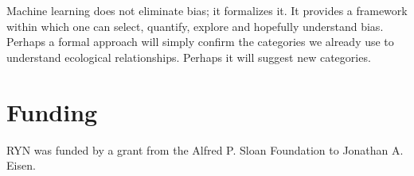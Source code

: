 \documentclass[
10pt, %
a4paper, %
oneside, %
headinclude,footinclude, %
BCOR5mm, %
]{scrartcl}
\begin{document}
Machine learning does not eliminate bias; it formalizes it. It provides a framework within which one can select, quantify, explore and hopefully understand bias. Perhaps a formal approach will simply confirm the categories we already use to understand ecological relationships. Perhaps it will suggest new categories.

\section{Funding}

RYN was funded by a grant from the Alfred P. Sloan Foundation to Jonathan A. Eisen.

\printbibliography[heading=subbibliography]

\clearpage


\end{document}
